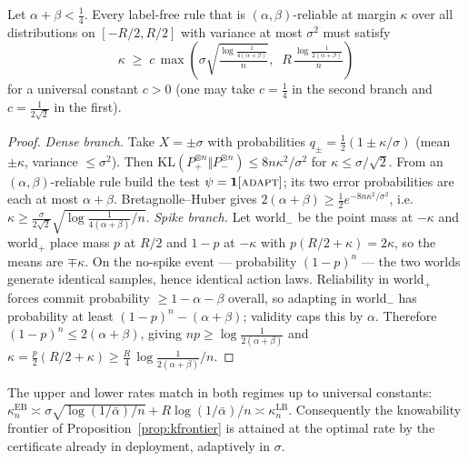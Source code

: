 \begin{proposition}\label{thm:rate-lb}
Let $\alpha+\beta<\tfrac14$. Every label-free rule that is $(\alpha,\beta)$-reliable at
margin $\kappa$ over all distributions on $[-R/2,R/2]$ with variance at most $\sigma^2$
must satisfy
\[
\kappa\;\ge\;c\,\max\!\left(\sigma\sqrt{\tfrac{\log\frac{1}{4(\alpha+\beta)}}{n}},\;\;
R\,\tfrac{\log\frac{1}{2(\alpha+\beta)}}{n}\right)
\]
for a universal constant $c>0$ (one may take $c=\tfrac14$ in the second branch and
$c=\tfrac{1}{2\sqrt2}$ in the first).
\end{proposition}
\begin{proof}
\emph{Dense branch.} Take $X=\pm\sigma$ with probabilities $q_\pm=\tfrac12(1\pm\kappa/\sigma)$
(mean $\pm\kappa$, variance $\le\sigma^2$). Then
$\mathrm{KL}(P_+^{\otimes n}\Vert P_-^{\otimes n})\le 8n\kappa^2/\sigma^2$ for
$\kappa\le\sigma/\sqrt2$. From an $(\alpha,\beta)$-reliable rule build the test
$\psi=\mathbf1[\textsc{adapt}]$; its two error probabilities are each at most
$\alpha+\beta$. Bretagnolle--Huber gives
$2(\alpha+\beta)\ge\tfrac12 e^{-8n\kappa^2/\sigma^2}$, i.e.\
$\kappa\ge\tfrac{\sigma}{2\sqrt2}\sqrt{\log\frac{1}{4(\alpha+\beta)}/n}$.
\emph{Spike branch.} Let world$_-$ be the point mass at $-\kappa$ and world$_+$ place
mass $p$ at $R/2$ and $1-p$ at $-\kappa$ with $p(R/2+\kappa)=2\kappa$, so the means are
$\mp\kappa$. On the no-spike event --- probability $(1-p)^n$ --- the two worlds generate
identical samples, hence identical action laws. Reliability in world$_+$ forces commit
probability $\ge1-\alpha-\beta$ overall, so adapting in world$_-$ has probability at
least $(1-p)^n-(\alpha+\beta)$; validity caps this by $\alpha$. Therefore
$(1-p)^n\le2(\alpha+\beta)$, giving $np\ge\log\frac{1}{2(\alpha+\beta)}$ and
$\kappa=\tfrac{p}{2}(R/2+\kappa)\ge\tfrac{R}{4}\,\log\frac{1}{2(\alpha+\beta)}/n$.
\end{proof}

\begin{proposition}\label{prop:rate-opt}
The upper and lower rates match in both regimes up to universal constants:
$\kappa_n^{\mathrm{EB}}\asymp \sigma\sqrt{\log(1/\bar\alpha)/n}+R\log(1/\bar\alpha)/n
\asymp\kappa_n^{\mathrm{LB}}$. Consequently the knowability frontier of
Proposition~\ref{prop:kfrontier} is attained at the optimal rate by the certificate already
in deployment, adaptively in $\sigma$.
\end{proposition}

